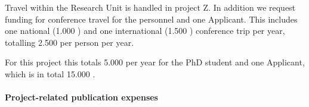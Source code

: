 \documentclass[10pt,fleqn,twoside,a4paper]{article}
\begin{document}
% 
% 

Travel within the Research Unit is handled in project Z. In addition we
request funding for conference travel for the personnel and one Applicant.
This includes one national (1.000 \EUR{}) and one international (1.500 \EUR{})
conference trip per year, totalling 2.500 \EUR{} per person per year. 

For this project this totals 5.000 \EUR{} per year for the PhD student
and one Applicant, which is in total 15.000 \EUR{}.








\paragraph{Project-related publication expenses}
\end{document}
